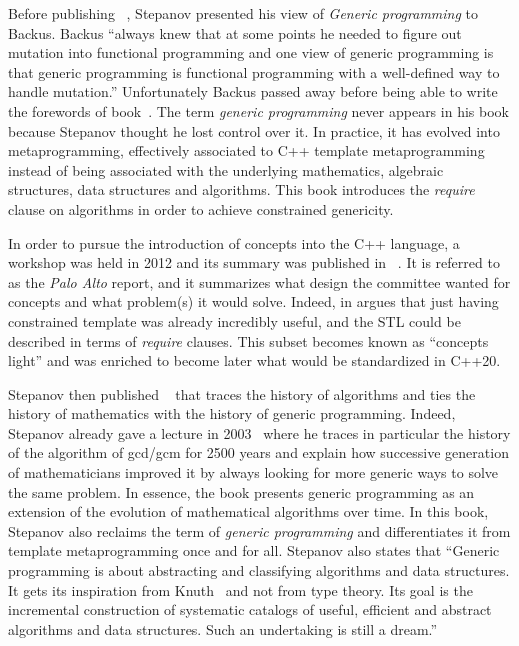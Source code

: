Before publishing ~\parencite{stepanov.2009.elements}, Stepanov presented his view of
\emph{Generic programming} to Backus. Backus ``always knew that at some points he needed to figure out mutation into
functional programming and one view of generic programming is that generic programming is functional programming with a
well-defined way to handle mutation.'' Unfortunately Backus passed away before being able to write the forewords of
 book~\parencite{parent.2018.generic-programming}. The term \emph{generic programming}
never appears in his book because Stepanov thought he lost control over it. In practice, it has evolved into
metaprogramming, effectively associated to C++ template metaprogramming instead of being associated with the underlying
mathematics, algebraic structures, data structures and algorithms. This book introduces the \emph{require} clause on
algorithms in order to achieve constrained genericity.

In order to pursue the introduction of concepts into the C++ language, a workshop was held in 2012 and its summary was
published in ~\parencite{sutton.2012.concepts}. It is referred to as the \emph{Palo
  Alto} report, and it summarizes what design the committee wanted for concepts and what problem(s) it would solve.
Indeed, in  argues that just having constrained template was already incredibly
useful, and the STL could be described in terms of \emph{require} clauses. This subset becomes known as ``concepts
light'' and was enriched to become later what would be standardized in C++20.

Stepanov then published ~\parencite{stepanov.2014.mathematics} that traces the
history of algorithms and ties the history of mathematics with the history of generic programming. Indeed, Stepanov
already gave a lecture in 2003~\parencite{stepanov.2003.gcm} where he traces in particular the history of the algorithm
of gcd/gcm for 2500 years and explain how successive generation of mathematicians improved it by always looking for more
generic ways to solve the same problem. In essence, the book presents generic programming as an extension of the
evolution of mathematical algorithms over time. In this book, Stepanov also reclaims the term of \emph{generic
  programming} and differentiates it from template metaprogramming once and for all. Stepanov also states that ``Generic
programming is about abstracting and classifying algorithms and data structures. It gets its inspiration from
Knuth~\parencite{knuth.2014.art} and not from type theory. Its goal is the incremental construction of systematic
catalogs of useful, efficient and abstract algorithms and data structures. Such an undertaking is still a dream.''

